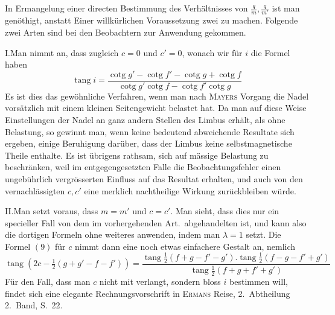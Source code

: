 \par\clearpage
{}
In Ermangelung einer directen Bestimmung des Verhältnisses von $\frac{q}{m},\frac{q}{m'}$ ist man genöthigt, anstatt Einer willkürlichen Voraussetzung zwei zu machen. Folgende zwei Arten sind bei den Beobachtern zur Anwendung gekommen.

I.\quad Man nimmt an, dass zugleich $c=0$ und $c'=0$, wonach wir für $i$ die Formel haben
\[
\operatorname{tang}i=\frac{\operatorname{cotg}g'-\operatorname{cotg}f'-\operatorname{cotg}g+\operatorname{cotg}f}{\operatorname{cotg}g'\operatorname{cotg}f-\operatorname{cotg}f'\operatorname{cotg}g}
\]
Es ist dies das gewöhnliche Verfahren, wenn man nach \textsc{Mayers} Vorgang die Nadel vorsätzlich mit einem kleinen Seitengewicht belastet hat. Da man auf diese Weise Einstellungen der Nadel an ganz andern Stellen des Limbus erhält, als ohne Belastung, so gewinnt man, wenn keine bedeutend abweichende Resultate sich ergeben, einige Beruhigung darüber, dass der Limbus keine selbstmagnetische Theile enthalte. Es ist übrigens rathsam, sich auf mässige Belastung zu beschränken, weil im entgegengesetzten Falle die Beobachtungsfehler einen ungebührlich vergrösserten Einfluss auf das Resultat erhalten, und auch von den vernachlässigten $c,c'$ eine merklich nachtheilige Wirkung zurückbleiben würde.

II.\quad Man setzt voraus, dass $m=m'$ und $c=c'$. Man sieht, dass dies nur ein specieller Fall von dem im vorhergehenden Art.\ abgehandelten ist, und kann also die dortigen Formeln ohne weiteres anwenden, indem man $\lambda=1$ setzt. Die Formel $(9)$ für $c$ nimmt dann eine noch etwas einfachere Gestalt an, nemlich
\[
\operatorname{tang}(2c-\tfrac12(g+g'-f-f'))=\frac{\operatorname{tang}\frac12(f+g-f'-g').\operatorname{tang}\frac12(f-g-f'+g')}{\operatorname{tang}\frac12(f+g+f'+g')}
\]
Für den Fall, dass man $c$ nicht mit verlangt, sondern bloss $i$ bestimmen will, findet sich eine elegante Rechnungsvorschrift in \textsc{Ermans} Reise, 2.\ Abtheilung 2.\ Band, S.\ 22.

